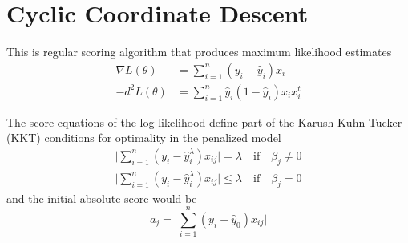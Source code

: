 \chapter{Cyclic Coordinate Descent}
\label{app:H}
This is regular scoring algorithm that produces maximum likelihood estimates
\begin{equation}
    \begin{split}
        \nabla L(\theta) &= \sum_{i=1}^n (y_i - \hat{y}_i)x_i \\
        -d^2 L(\theta) &= \sum_{i=1}^n \hat{y}_i (1 - \hat{y}_i)x_i x_i^t
    \end{split}
\end{equation}

The score equations of the log-likelihood define part of the Karush-Kuhn-Tucker (KKT) conditions for optimality in the penalized model
\begin{align}
    \Big|\sum_{i=1}^n (y_i - \hat{y}_i^\lambda) x_{ij} \Big| = \lambda \quad \text{if} \quad \beta_j \neq 0 \\
    \Big|\sum_{i=1}^n (y_i - \hat{y}_i^\lambda) x_{ij} \Big| \leq \lambda \quad \text{if} \quad \beta_j = 0
\end{align}
and the initial absolute score would be
\begin{equation}
    a_j = \Big|\sum_{i=1}^n (y_i - \hat{y}_0) x_{ij} \Big|
\end{equation}

